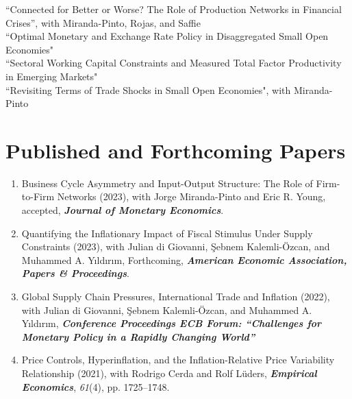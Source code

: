 \documentclass[10pt]{article}
\begin{document}
\noindent ``Connected for Better or Worse? The Role of Production Networks in Financial Crises'', with Miranda-Pinto, Rojas, and Saffie\\[-0.125in]

\noindent ``Optimal Monetary and Exchange Rate Policy in Disaggregated Small Open Economies"\\[-0.125in]

\noindent ``Sectoral Working Capital Constraints and Measured Total Factor Productivity in Emerging Markets"\\[-0.125in]

\noindent ``Revisiting Terms of Trade Shocks in Small Open Economies", with Miranda-Pinto





\section*{Published and Forthcoming Papers}
\iffalse
\begin{enumerate}[wide, labelwidth=!,labelindent=5pt]
    \item Business Cycle Asymmetry and Input-Output Structure: The Role of Firm-to-Firm Networks (2023), with Jorge Miranda-Pinto and Eric R. Young, accepted, \emph{\bfseries Journal of Monetary Economics}.
    \item Quantifying the Inflationary Impact of Fiscal Stimulus Under Supply Constraints (2023), with Julian di Giovanni, \c{S}ebnem Kalemli-\"{O}zcan, and Muhammed A. Y{\i}ld{\i}r{\i}m, Forthcoming, \emph{\bfseries American Economic Association, Papers \& Proceedings}.
    \item Global Supply Chain Pressures, International Trade and Inflation (2022), with Julian di Giovanni, \c{S}ebnem Kalemli-\"{O}zcan, and Muhammed A. Y{\i}ld{\i}r{\i}m,  \textit{\bfseries Conference Proceedings ECB Forum: ``Challenges for Monetary Policy in a Rapidly Changing World''}
    \item Price Controls, Hyperinflation, and the Inflation-Relative Price Variability Relationship (2021), with Rodrigo Cerda and Rolf L\"{u}ders,  \textbf{\textit{Empirical Economics}}, \emph{61}(4), pp. 1725--1748.
\end{enumerate}
\end{document}
